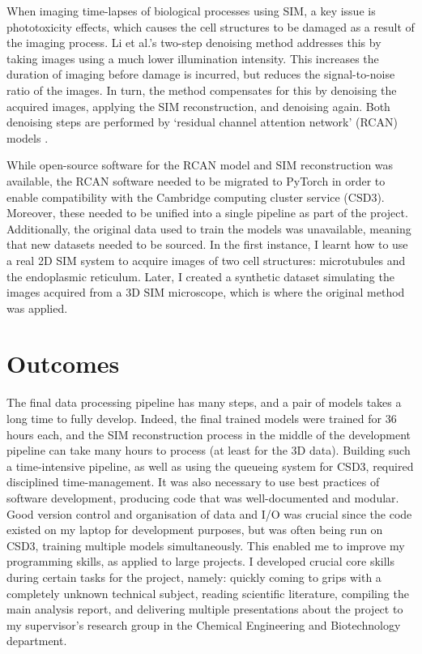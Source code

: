 \documentclass[12pt]{article}
\begin{document}
When imaging time-lapses of biological processes using SIM,
a key issue is phototoxicity effects,
which causes the cell structures to be damaged as a result of the imaging process.
Li et al.'s two-step denoising method \cite{keypaper} addresses this by taking images using a much lower illumination intensity.
This increases the duration of imaging before damage is incurred, but reduces the signal-to-noise ratio of the images.
In turn, the method compensates for this by denoising the acquired images, applying the SIM reconstruction, and denoising again.
Both denoising steps are performed by `residual channel attention network' (RCAN) models \cite{keypaper}.

While open-source software for the RCAN model and SIM reconstruction was available,
the RCAN software needed to be migrated to PyTorch in order to enable compatibility with the Cambridge computing cluster service (CSD3).
Moreover, these needed to be unified into a single pipeline as part of the project.
Additionally, the original data used to train the models was unavailable,
meaning that new datasets needed to be sourced.
In the first instance, I learnt how to use a real 2D SIM system to acquire images of two cell structures: microtubules and the endoplasmic reticulum.
Later, I created a synthetic dataset simulating the images acquired from a 3D SIM microscope,
which is where the original method was applied.

\section{Outcomes}

The final data processing pipeline has many steps,
and a pair of models takes a long time to fully develop.
Indeed, the final trained models were trained for 36 hours each,
and the SIM reconstruction process in the middle of the development pipeline can take many hours to process (at least for the 3D data).
Building such a time-intensive pipeline, as well as using the queueing system for CSD3, required disciplined time-management.
It was also necessary to use best practices of software development, producing code that was well-documented and modular.
Good version control and organisation of data and I/O was crucial since the code existed on my laptop for development purposes,
but was often being run on CSD3, training multiple models simultaneously.
This enabled me to improve my programming skills, as applied to large projects.
I developed crucial core skills during certain tasks for the project, namely:
quickly coming to grips with a completely unknown technical subject,
reading scientific literature,
compiling the main analysis report,
and delivering multiple presentations about the project to my supervisor's research group in the Chemical Engineering and Biotechnology department.
\end{document}
